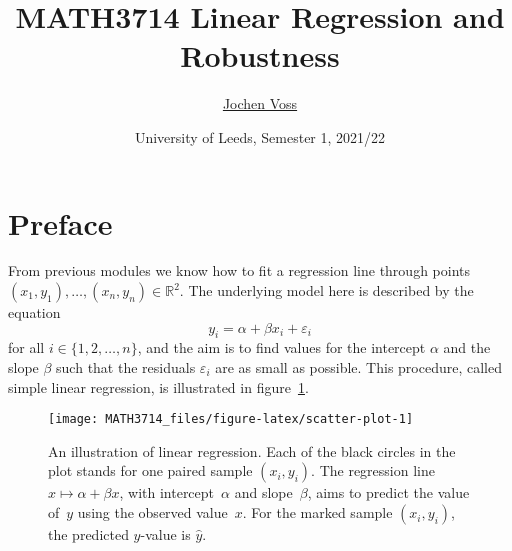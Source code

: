 \documentclass[
  a4paper,
]{article}
\title{MATH3714 Linear Regression and Robustness}
\author{\href{mailto:J.Voss@leeds.ac.uk}{Jochen Voss}}
\date{University of Leeds, Semester 1, 2021/22}
\theoremstyle{definition}
\theoremstyle{definition}
\theoremstyle{definition}
\theoremstyle{definition}
\theoremstyle{remark}
\begin{document}
\maketitle

{
\setcounter{tocdepth}{2}
\tableofcontents
}
\newcommand{\argmin}{\mathop{\mathrm{arg\,min}}\limits}
\newcommand{\bias}{\mathop{\mathrm{bias}}}
\newcommand{\cor}{\mathop{\mathrm{cor}}}
\newcommand{\Cov}{\mathop{\mathrm{Cov}}}
\newcommand{\CN}{\mathcal{N}}
\newcommand{\ds}{\displaystyle}
\newcommand{\E}{\mathbb{E}}
\newcommand{\eps}{\varepsilon}
\newcommand{\MSE}{\mathop{\mathrm{MSE}}\nolimits}
\renewcommand{\phi}{\varphi}
\newcommand{\R}{\mathbb{R}}
\newcommand{\rank}{\mathop{\mathrm{rank}}}
\newcommand{\se}{\mathop{\mathrm{se}}}
\newcommand{\stdev}{\mathop{\mathrm{stdev}}}
\newcommand{\tr}{\mathop{\mathrm{tr}}}
\newcommand{\Var}{\mathop{\mathrm{Var}}}
\newcommand{\xfrac}[2]{\frac{\,#1\,}{\,#2\,}}

\hypertarget{home}{%
\section*{Preface}\label{home}}

From previous modules we know how to fit a regression line through
points \((x_1, y_1), \ldots, (x_n, y_n) \in\mathbb{R}^2\). The underlying model
here is described by the equation
\begin{equation*}
  y_i
  = \alpha + \beta x_i + \varepsilon_i
\end{equation*}
for all \(i \in \{1, 2, \ldots, n\}\), and the aim is to find values for
the intercept \(\alpha\) and the slope \(\beta\) such that the residuals
\(\varepsilon_i\) are as small as possible. This procedure, called simple
linear regression, is illustrated in figure~\ref{fig:scatter-plot}.



\begin{figure}

{\centering \texttt{[image: MATH3714\_files/figure-latex/scatter-plot-1]} 

}

\caption{An illustration of linear regression. Each of the black circles in the plot stands for one paired sample \((x_i, y_i)\). The regression line \(x \mapsto \alpha + \beta x\), with intercept~\(\alpha\) and slope~\(\beta\), aims to predict the value of~\(y\) using the observed value~\(x\). For the marked sample \((x_i, y_i)\), the predicted \(y\)-value is \(\hat y\).}\label{fig:scatter-plot}
\end{figure}
\end{document}
